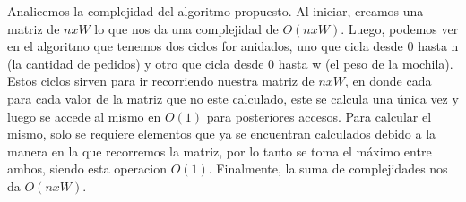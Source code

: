 Analicemos la complejidad del algoritmo propuesto. Al iniciar, creamos una matriz de $nxW$ lo que nos da una complejidad de $O(nxW)$.
Luego, podemos ver en el algoritmo que tenemos dos ciclos for anidados, uno que cicla desde 0 hasta n (la cantidad de pedidos) y otro que cicla desde 0 hasta w (el peso de la mochila). Estos ciclos sirven para ir recorriendo nuestra matriz de $nxW$, en donde cada para cada valor de la matriz que no este calculado, este se calcula una única vez y luego se accede al mismo en $O(1)$ para posteriores accesos. Para calcular el mismo, solo se requiere elementos que ya se encuentran calculados debido a la manera en la que recorremos la matriz, por lo tanto se toma el máximo entre ambos, siendo esta operacion $O(1)$. Finalmente, la suma de complejidades nos da $O(nxW)$.
